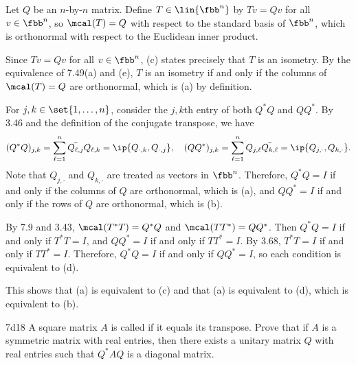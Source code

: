 \begin{sol}
    Let $Q$ be an $n$-by-$n$ matrix.
    Define $T \in \lin{\fbb^n}$ by $Tv = Qv$ for all $v \in \fbb^n$, so $\mcal(T) = Q$ with respect to the standard basis of $\fbb^n$, which is orthonormal with respect to the Euclidean inner product.

    \noindent{} Since $Tv = Qv$ for all $v \in \fbb^n$, (c) states precisely that $T$ is an isometry.
    By the equivalence of 7.49(a) and (e), $T$ is an isometry if and only if the columns of $\mcal(T) = Q$ are orthonormal, which is (a) by definition.

    \noindent{} For $j, k \in \set{1, \ldots, n}$, consider the $j, k$th entry of both $Q^\ast Q$ and $QQ^\ast$.
    By 3.46 and the definition of the conjugate transpose, we have
    \[
        (Q^\ast Q)_{j, k} = \sum_{\ell=1}^n \bar{Q_{\ell, j}} Q_{\ell, k} = \ip{Q_{\cdot, k}, Q_{\cdot, j}}, \quad
        (QQ^\ast)_{j, k} = \sum_{\ell=1}^n Q_{j, \ell} \bar{Q_{k, \ell}} = \ip{Q_{j, \cdot}, Q_{k, \cdot}}.
    \]
    Note that $Q_{j, \cdot}$ and $Q_{k, \cdot}$ are treated as vectors in $\fbb^n$.
    Therefore, $Q^\ast Q = I$ if and only if the columns of $Q$ are orthonormal, which is (a), and $QQ^\ast = I$ if and only if the rows of $Q$ are orthonormal, which is (b).

    \noindent{} By 7.9 and 3.43, $\mcal(T^\ast T) = Q^\ast Q$ and $\mcal(TT^\ast) = QQ^\ast$.
    Then $Q^\ast Q = I$ if and only if $T^\ast T = I$, and $QQ^\ast = I$ if and only if $TT^\ast = I$.
    By 3.68, $T^\ast T = I$ if and only if $TT^\ast = I$.
    Therefore, $Q^\ast Q = I$ if and only if $QQ^\ast = I$, so each condition is equivalent to (d).

    This shows that (a) is equivalent to (c) and that (a) is equivalent to (d), which is equivalent to (b).
\end{sol}

\begin{exercise}{7d18}
    A square matrix $A$ is called  if it equals its transpose.
    Prove that if $A$ is a symmetric matrix with real entries, then there exists a unitary matrix $Q$ with real entries such that $Q^\ast AQ$ is a diagonal matrix.
\end{exercise}

